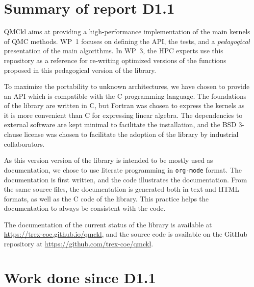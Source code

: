 \newcommand{\orgmode}{\texttt{org-mode}}
\newcommand{\Makefile}{\texttt{Makefile}}
\newcommand{\context}{\texttt{context}}
\newcommand{\CC}{C\nolinebreak\hspace{-.05em}\raisebox{.4ex}{\tiny\bf +}\nolinebreak\hspace{-.10em}\raisebox{.4ex}{\tiny\bf +}}
\def\CC{{C\nolinebreak[4]\hspace{-.05em}\raisebox{.4ex}{\tiny\bf ++}}}

\section{Summary of report D1.1}


\Ac{QMCkl} aims at providing a high-performance
implementation of the main kernels of \ac{QMC} methods. 
\ac{WP}~1 focuses on defining the \ac{API}, the tests,
and a \emph{pedagogical} presentation of the main algorithms.
In \ac{WP}~3, the \ac{HPC} experts use this repository as a reference for re-writing
optimized versions of the functions proposed in this pedagogical version of the library.

To maximize the portability to unknown architectures, we have chosen to provide an \ac{API} which
is compatible with the C programming language. The foundations of the library are written in C, but Fortran
was chosen to express the kernels as it is more convenient than C for expressing linear algebra.
The dependencies to external software are kept minimal to facilitate the installation, and the
BSD 3-clause license was chosen to facilitate the adoption of the library by industrial 
collaborators.

As this version version of the library is intended to be mostly used as documentation, 
we chose to use literate programming\cite{knuth_1992} in {\orgmode}
format.\cite{schulte_2012,orgmode} The documentation
is first written, and the code illustrates the documentation. From the same source files,
the documentation is generated both in text and HTML formats, as well as the C code of the library.
This practice helps the documentation to always be consistent with the code.

The documentation of the current status of the library is available
at \url{https://trex-coe.github.io/qmckl}, and the source code is
available on the GitHub repository at \url{https://github.com/trex-coe/qmckl}.


\section{Work done since D1.1}

